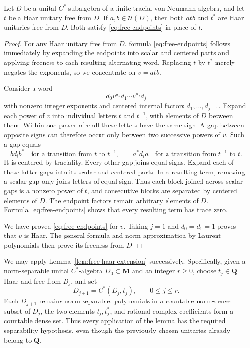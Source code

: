 \begin{lemma}
\label{lem:haar-absorption}
Let $D$ be a unital $C^*$-subalgebra of a finite tracial von Neumann
algebra, and let $t$ be a Haar unitary free from $D$.  If
$a,b\in\mathcal U(D)$, then both $atb$ and $t^*$ are Haar unitaries
free from $D$.  Both satisfy \eqref{eq:free-endpoints} in place of $t$.
\end{lemma}

\begin{proof}
For any Haar unitary free from $D$, formula
\eqref{eq:free-endpoints} follows immediately by expanding the
endpoints into scalar and centered parts and applying freeness to
each resulting alternating word.  Replacing $t$ by $t^*$ merely
negates the exponents, so we concentrate on $v=atb$.

Consider a word
\[
  d_0v^{n_1}d_1\cdots v^{n_j}d_j
\]
with nonzero integer exponents and centered internal factors
$d_1,\ldots,d_{j-1}$.  Expand each power of $v$ into individual
letters $t$ and $t^{-1}$, with elements of $D$ between them.  Within
one power of $v$ all these letters have the same sign.  A gap
between opposite signs can therefore occur only between two
successive powers of $v$.  Such a gap equals
\[
  b d_i b^* \quad\text{for a transition from $t$ to $t^{-1}$},
  \qquad
  a^*d_i a \quad\text{for a transition from $t^{-1}$ to $t$}.
\]
It is centered by traciality.  Every other gap joins equal signs.
Expand each of these latter gaps into its scalar and centered
parts.  In a resulting term, removing a scalar gap only joins
letters of equal sign.  Thus each block joined across scalar gaps
is a nonzero power of $t$, and consecutive blocks are separated by
centered elements of $D$.  The endpoint factors remain arbitrary
elements of $D$.  Formula~\eqref{eq:free-endpoints} shows that every
resulting term has trace zero.

We have proved \eqref{eq:free-endpoints} for $v$.  Taking $j=1$
and $d_0=d_1=1$ proves that $v$ is Haar.  The general formula and
norm approximation by Laurent polynomials then prove its freeness
from $D$.
\end{proof}

We may apply Lemma~\ref{lem:free-haar-extension} successively.
Specifically, given a norm-separable unital $C^*$-algebra $D_0\subset
\mathbf M$ and an integer $r\geq0$, choose $t_j\in\mathbf Q$ Haar
and free from $D_j$, and set
\[
  D_{j+1}=C^*(D_j,t_j),\qquad 0\leq j\leq r.
\]
Each $D_{j+1}$ remains norm separable: polynomials in a countable
norm-dense subset of $D_j$, the two elements $t_j,t_j^*$, and
rational complex coefficients form a countable dense set.  Thus
every application of the lemma has the required separability
hypothesis, even though the previously chosen unitaries already
belong to $\mathbf Q$.

